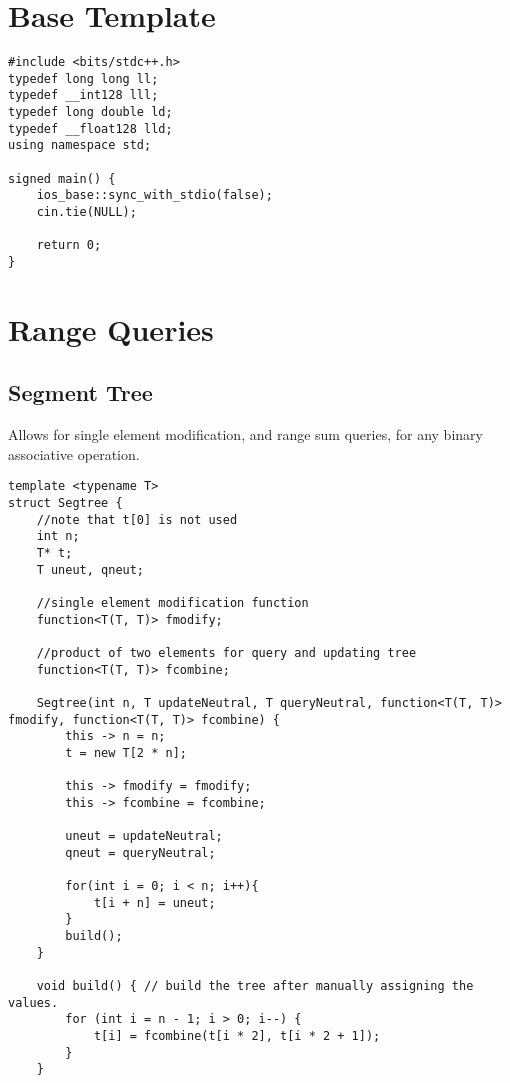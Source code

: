 \documentclass[8pt, headheight=10pt, a4paper]{article}
\title{\scalebox{2}{\fontsize{32pt}{0pt}\selectfont \textbf{goon}}}
\author{\scalebox{1}{\fontsize{16pt}{0pt}\selectfont {Andwerp, dmot, Duckling}}}
\affil{\scalebox{1}{\fontsize{12pt}{0pt}\selectfont {Texas A\&M University}}}
\begin{document}
\begin{titlingpage}
\maketitle
\end{titlingpage}
\pagebreak

\begin{multicols*}{3}
\section{Base Template}
\begin{lstlisting}
#include <bits/stdc++.h>
typedef long long ll;
typedef __int128 lll;
typedef long double ld;
typedef __float128 lld;
using namespace std;

signed main() {
    ios_base::sync_with_stdio(false);
    cin.tie(NULL);
    
    return 0;
}
\end{lstlisting}

\section{Range Queries}
\subsection{Segment Tree}
Allows for single element modification, and range sum queries, for any binary associative operation. 
\begin{lstlisting}
template <typename T>
struct Segtree {
    //note that t[0] is not used
    int n;
    T* t;
    T uneut, qneut;

    //single element modification function
    function<T(T, T)> fmodify;

    //product of two elements for query and updating tree
    function<T(T, T)> fcombine;

    Segtree(int n, T updateNeutral, T queryNeutral, function<T(T, T)> fmodify, function<T(T, T)> fcombine) {
        this -> n = n;
        t = new T[2 * n];

        this -> fmodify = fmodify;
        this -> fcombine = fcombine;

        uneut = updateNeutral;
        qneut = queryNeutral;

        for(int i = 0; i < n; i++){
            t[i + n] = uneut;
        }
        build();
    }

    void build() { // build the tree after manually assigning the values.
        for (int i = n - 1; i > 0; i--) {   
            t[i] = fcombine(t[i * 2], t[i * 2 + 1]);
        }
    }


\end{lstlisting}
\end{multicols*}
\end{document}
